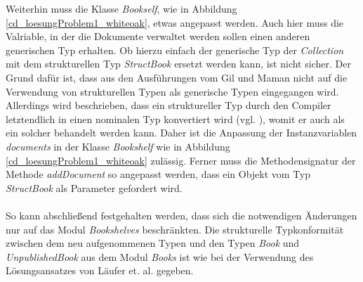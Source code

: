 \documentclass[11pt, 
ngerman,
doublespacing,
chapterinoneline, %
consistentlayout, %
]{scrartcl}
\begin{document}
Weiterhin muss die Klasse \emph{Bookself}, wie in Abbildung \ref{cd_loesungProblem1_whiteoak}, etwas angepasst werden. Auch hier muss die Valriable, in der die Dokumente verwaltet werden sollen einen anderen generischen Typ erhalten. Ob hierzu einfach der generische Typ der \emph{Collection} mit dem strukturellen Typ \emph{StructBook} ersetzt werden kann, ist nicht sicher. Der Grund dafür ist, dass aus den Ausführungen vom Gil und Maman \cite{whiteoak} nicht auf die Verwendung von strukturellen Typen als generische Typen eingegangen wird. Allerdings wird beschrieben, dass ein struktureller Typ durch den Compiler letztendlich in einen nominalen Typ konvertiert wird (vgl. \cite{whiteoak}), womit er auch als ein solcher behandelt werden kann. Daher ist die Anpassung  der Instanzvariablen \emph{documents} in der Klasse \emph{Bookshelf} wie in Abbildung \ref{cd_loesungProblem1_whiteoak} zulässig.
Ferner muss die Methodensignatur der Methode \emph{addDocument} so angepasst werden, dass ein Objekt vom Typ \emph{StructBook} als Parameter gefordert wird.\\\\
So kann abschließend festgehalten werden, dass sich die notwendigen Änderungen nur auf das Modul \emph{Bookshelves} beschränkten. Die strukturelle Typkonformität zwischen dem neu aufgenommenen Typen und den Typen \emph{Book} und \emph{UnpublishedBook}
aus dem Modul \emph{Books} ist wie bei der Verwendung des Lösungsansatzes von Läufer et. al. \cite{structconfjava} gegeben.
\end{document}
